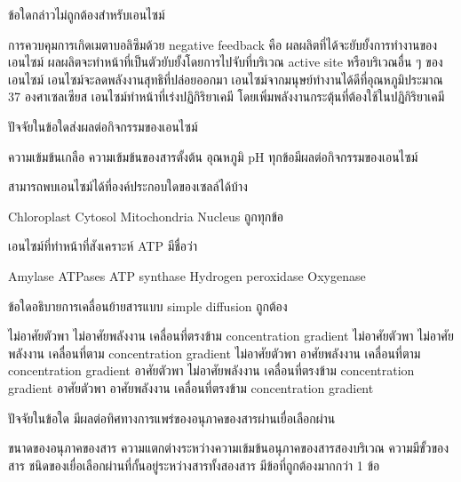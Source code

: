 \begin{questions}
\filbreak
  \question ข้อใดกล่าวไม่ถูกต้องสำหรับเอนไซม์
  \begin{choices}
    \choice การควบคุมการเกิดเมตาบอลิซึมด้วย negative feedback คือ ผลผลิตที่ได้จะยับยั้งการทำงานของเอนไซม์
    \choice ผลผลิตจะทำหน้าที่เป็นตัวยับยั้งโดยการไปจับที่บริเวณ active site หรือบริเวณอื่น ๆ ของเอนไซม์
    \choice เอนไซม์จะลดพลังงานสุทธิที่ปล่อยออกมา
    \choice เอนไซม์จากมนุษย์ทำงานได้ดีที่อุณหภูมิประมาณ 37 องศาเซลเซียส
    \choice เอนไซม์ทำหน้าที่เร่งปฏิกิริยาเคมี โดยเพิ่มพลังงานกระตุ้นที่ต้องใช้ในปฏิกิริยาเคมี
\end{choices}

\filbreak
  \question ปัจจัยในข้อใดส่งผลต่อกิจกรรมของเอนไซม์
  \begin{choices}
    \choice ความเข้มข้นเกลือ
    \choice ความเข้มข้นของสารตั้งต้น
    \choice อุณหภูมิ
    \choice pH
    \choice ทุกข้อมีผลต่อกิจกรรมของเอนไซม์
\end{choices}

\filbreak
  \question สามารถพบเอนไซม์ได้ที่องค์ประกอบใดของเซลล์ได้บ้าง
  \begin{choices}
    \choice Chloroplast
    \choice Cytosol
    \choice Mitochondria
    \choice Nucleus
    \choice ถูกทุกข้อ
\end{choices}

\filbreak
  \question เอนไซม์ที่ทำหน้าที่สังเคราะห์ ATP มีชื่อว่า
  \begin{choices}
    \choice Amylase
    \choice ATPases
    \choice ATP synthase
    \choice Hydrogen peroxidase
    \choice Oxygenase
\end{choices}

\filbreak
  \question ข้อใดอธิบายการเคลื่อนย้ายสารแบบ simple diffusion ถูกต้อง
  \begin{choices}
    \choice ไม่อาศัยตัวพา ไม่อาศัยพลังงาน เคลื่อนที่ตรงข้าม concentration gradient
    \choice ไม่อาศัยตัวพา ไม่อาศัยพลังงาน เคลื่อนที่ตาม concentration gradient
    \choice ไม่อาศัยตัวพา อาศัยพลังงาน เคลื่อนที่ตาม concentration gradient
    \choice อาศัยตัวพา ไม่อาศัยพลังงาน เคลื่อนที่ตรงข้าม concentration gradient
    \choice อาศัยตัวพา อาศัยพลังงาน เคลื่อนที่ตรงข้าม concentration gradient
\end{choices}

\filbreak
  \question ปัจจัยในข้อใด มีผลต่อทิศทางการแพร่ของอนุภาคของสารผ่านเยื่อเลือกผ่าน
  \begin{choices}
    \choice ขนาดของอนุภาคของสาร
    \choice ความแตกต่างระหว่างความเข้มข้นอนุภาคของสารสองบริเวณ
    \choice ความมีขั้วของสาร
    \choice ชนิดของเยื่อเลือกผ่านที่กั้นอยู่ระหว่างสารทั้งสองสาร
    \choice มีข้อที่ถูกต้องมากกว่า 1 ข้อ
\end{choices}


\end{questions}

